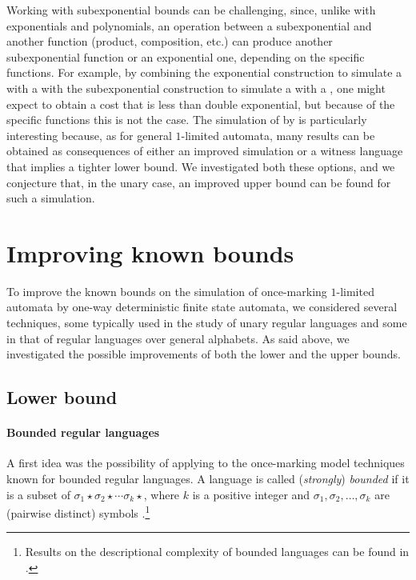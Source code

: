 Working with subexponential bounds can be challenging, since, unlike with exponentials and polynomials, an operation between a subexponential and another function (product, composition, etc.) can produce another subexponential function or an exponential one, depending on the specific functions.
For example, by combining the exponential construction to simulate a \OLA with a \ONFA with the subexponential construction to simulate a \ONFA with a \ODFA, one might expect to obtain a cost that is less than double exponential, but because of the specific functions this is not the case.
The simulation of \OMOLA by \ODFA is particularly interesting because, as for general $1$-limited automata, many results can be obtained as consequences of either an improved simulation or a witness language that implies a tighter lower bound.
We investigated both these options, and we conjecture that, in the unary case, an improved upper bound can be found for such a simulation.



\section{Improving known bounds}\label{sec:oncemarking-ideas}
To improve the known bounds on the simulation of once-marking $1$-limited automata by one-way deterministic finite state automata, we considered several techniques, some typically used in the study of unary regular languages and some in that of regular languages over general alphabets.
As said above, we investigated the possible improvements of both the lower and the upper bounds.


\subsection{Lower bound}

\paragraph{Bounded regular languages} A first idea was the possibility of applying to the once-marking model techniques known for bounded regular languages.
A language is called (\emph{strongly}) \emph{bounded} if it is a subset of $\sigma_1\star\sigma_2\star\cdots\sigma_k\star$, where $k$ is a positive integer and $\sigma_1,\sigma_2,\dots,\sigma_k$ are (pairwise distinct) symbols \cite{GinSpa66}.\footnote{%
	Results on the descriptional complexity of bounded languages can be found in \cite{Gin66,MalPig13,IbaRav16,HerKut+17}.}

